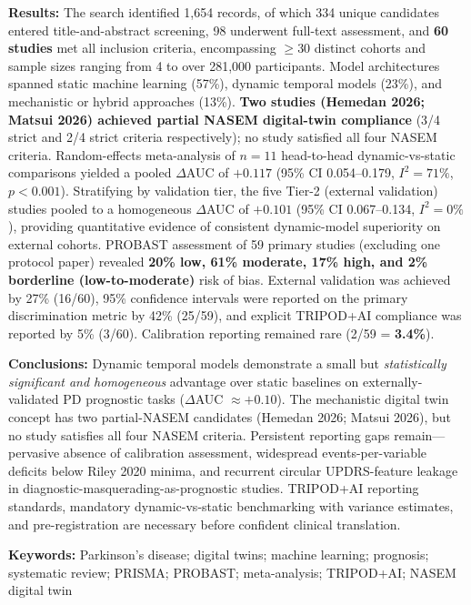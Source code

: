 \noindent\textbf{Results:}
The search identified 1{,}654 records, of which 334 unique candidates entered title-and-abstract screening, 98 underwent full-text assessment, and \textbf{60 studies} met all inclusion criteria, encompassing $\geq$30 distinct cohorts and sample sizes ranging from 4 to over 281{,}000 participants. Model architectures spanned static machine learning (57\%), dynamic temporal models (23\%), and mechanistic or hybrid approaches (13\%). \textbf{Two studies (Hemedan 2026; Matsui 2026) achieved partial NASEM digital-twin compliance} (3/4 strict and 2/4 strict criteria respectively); no study satisfied all four NASEM criteria. Random-effects meta-analysis of $n=11$ head-to-head dynamic-vs-static comparisons yielded a pooled $\Delta$AUC of $+0.117$ (95\% CI 0.054--0.179, $I^2=71\%$, $p<0.001$). Stratifying by validation tier, the five Tier-2 (external validation) studies pooled to a homogeneous $\Delta$AUC of $+0.101$ (95\% CI 0.067--0.134, \textbf{$I^2=0\%$}), providing quantitative evidence of consistent dynamic-model superiority on external cohorts. PROBAST assessment of 59 primary studies (excluding one protocol paper) revealed \textbf{20\% low, 61\% moderate, 17\% high, and 2\% borderline (low-to-moderate)} risk of bias. External validation was achieved by 27\% (16/60), 95\% confidence intervals were reported on the primary discrimination metric by 42\% (25/59), and explicit TRIPOD+AI compliance was reported by 5\% (3/60). Calibration reporting remained rare (2/59 = \textbf{3.4\%}).

\noindent\textbf{Conclusions:}
Dynamic temporal models demonstrate a small but \emph{statistically significant and homogeneous} advantage over static baselines on externally-validated PD prognostic tasks ($\Delta$AUC $\approx +0.10$). The mechanistic digital twin concept has two partial-NASEM candidates (Hemedan 2026; Matsui 2026), but no study satisfies all four NASEM criteria. Persistent reporting gaps remain---pervasive absence of calibration assessment, widespread events-per-variable deficits below Riley 2020 minima, and recurrent circular UPDRS-feature leakage in diagnostic-masquerading-as-prognostic studies. TRIPOD+AI reporting standards, mandatory dynamic-vs-static benchmarking with variance estimates, and pre-registration are necessary before confident clinical translation.

\noindent\textbf{Keywords:} Parkinson's disease; digital twins; machine learning; prognosis; systematic review; PRISMA; PROBAST; meta-analysis; TRIPOD+AI; NASEM digital twin

